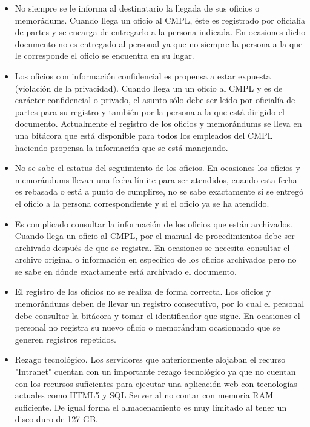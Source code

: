 \begin{itemize}
	\item No siempre se le informa al destinatario la llegada de sus oficios o memorádums.
Cuando llega un oficio al CMPL, éste es registrado por oficialía de partes y se encarga de entregarlo a la persona indicada. En ocasiones dicho documento no es entregado al personal ya que no siempre la persona a la que le corresponde el oficio se encuentra en su lugar. 

	\item Los oficios con información confidencial es propensa a estar expuesta (violación de la privacidad).
Cuando llega un un oficio al CMPL y es de carácter confidencial o privado, el asunto sólo debe ser leído por oficialía de partes para su registro y también por la persona a la que está dirigido el documento. Actualmente el registro de los oficios y memorándums se lleva en una bitácora que está disponible para todos los empleados del CMPL haciendo propensa la información que se está manejando.

	\item No se sabe el estatus del seguimiento de los oficios.
En ocasiones los oficios y memorándums llevan una fecha límite para ser atendidos, cuando esta fecha es rebasada o está a punto de cumplirse, no se sabe exactamente si se entregó el oficio a la persona correspondiente y si el oficio ya se ha atendido.

	\item Es complicado consultar la información de los oficios que están archivados.
Cuando llega un oficio al CMPL, por el manual de procedimientos debe ser archivado después de que se registra. En ocasiones se necesita consultar el archivo original o información en específico de los oficios archivados pero no se sabe en dónde exactamente está archivado el documento.	
	
	\item El registro de los oficios no se realiza de forma correcta.
Los oficios y memorándums deben de llevar un registro consecutivo, por lo cual el personal debe consultar la bitácora y tomar el identificador que sigue. En ocasiones el personal no registra su nuevo oficio o memorándum ocasionando que se generen registros repetidos.	
	
	\item Rezago tecnológico.
Los servidores que anteriormente alojaban el recurso "Intranet" cuentan con un importante rezago tecnológico ya que no cuentan con los recursos suficientes para ejecutar una aplicación web con tecnologías actuales como HTML5 y SQL Server al no contar con memoria RAM suficiente. De igual forma el almacenamiento es muy limitado al tener un disco duro de 127 GB.
	

\end{itemize}
